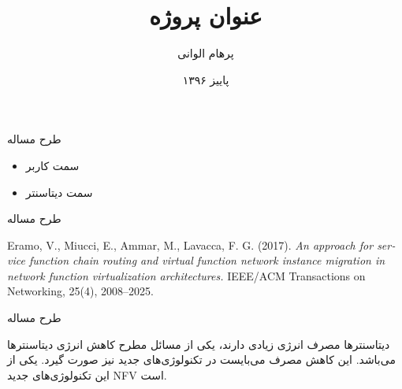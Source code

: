 \documentclass{beamer}
\title{
	عنوان پروژه
}
\subtitle{}
\author{پرهام الوانی}
\institute{دانشکده مهندسی کامپیوتر و فناوری اطلاعات}
\date{پاییز ۱۳۹۶}
\makeatletter
\newcommand{\RTList}{\raggedleft\rightskip\@totalleftmargin}
\makeatother
\begin{document}
\begin{persian}
\begin{frame}
\maketitle
\end{frame}

\everypar{\rightskip\rightmargin}
\begin{frame}{طرح مساله}
	\begin{itemize}\RTList
		\item سمت کاربر
		\item سمت دیتاسنتر
	\end{itemize}
\end{frame}
\begin{frame}{طرح مساله}
\begin{latin}\begin{thebibliography}{9}

Eramo, V., Miucci, E., Ammar, M., Lavacca, F. G. (2017).
\emph{An approach for service function chain routing and virtual function network instance migration in network function virtualization architectures.}
\relax IEEE/ACM Transactions on Networking, 25(4), 2008–2025.

\end{thebibliography}\end{latin}
\end{frame}
\begin{frame}{طرح مساله}
\par
دیتاسنترها مصرف انرژی زیادی دارند، یکی از مسائل مطرح کاهش انرژی دیتاسنترها می‌باشد.
این کاهش مصرف می‌بایست در تکنولوژی‌های جدید نیز صورت گیرد. یکی از این تکنولوژی‌های جدید NFV
است. 
\end{frame}

\end{persian}
\end{document}
